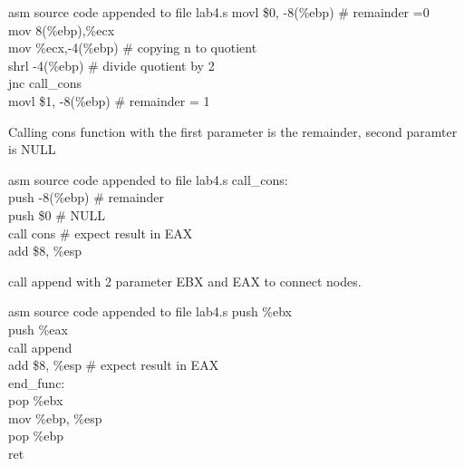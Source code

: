 \documentclass{article}
\begin{document}
\begin{GFT}{asm source code appended to file lab4.s}
\+  movl \$0, -8(\%ebp)		\# remainder =0\\
\+  mov 8(\%ebp),\%ecx\\
\+  mov \%ecx,-4(\%ebp) 		\# copying n to quotient\\
\+  shrl -4(\%ebp) 		\# divide quotient by 2\\
\+  jnc call\_cons\\
\+  movl \$1, -8(\%ebp) 		\# remainder = 1\\
\end{GFT}
\pagebreak
Calling cons function with the first parameter is the remainder, second paramter is NULL
\begin{GFT}{asm source code appended to file lab4.s}
\+call\_cons:\\
\+  push -8(\%ebp) 		\# remainder\\
\+  push \$0  			\# NULL\\
\+  call cons			\# expect result in EAX\\
\+  add \$8, \%esp\\
\end{GFT}
call append with 2 parameter EBX and EAX to connect nodes.
\begin{GFT}{asm source code appended to file lab4.s}
\+  push \%ebx\\
\+  push \%eax\\
\+  call append\\
\+  add \$8, \%esp			\# expect result in EAX\\
\+end\_func:\\
\+  pop \%ebx\\
\+  mov \%ebp, \%esp\\
\+  pop \%ebp\\
\+  ret\\
\+\\
\end{GFT}
\pagebreak
\end{document}

